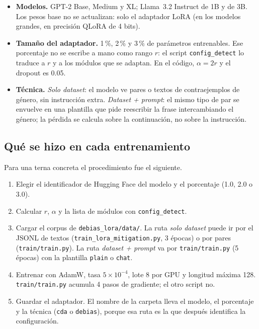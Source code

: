 \documentclass[11pt,a4paper]{article}
\newcommand{\archivo}[1]{\texttt{\nolinkurl{#1}}}
\begin{document}
\begin{itemize}[leftmargin=*, itemsep=0.35em]
  \item \textbf{Modelos.} GPT-2 Base, Medium y XL; Llama~3.2 Instruct de 1B y de 3B. Los pesos base no se
        actualizan: solo el adaptador LoRA (en los modelos grandes, en precisión QLoRA de 4 bits).
  \item \textbf{Tamaño del adaptador.} 1\,\%, 2\,\% y 3\,\% de parámetros entrenables. Ese porcentaje no se
        escribe a mano como rango $r$: el script \texttt{config\_detect} lo traduce a $r$ y a los módulos
        que se adaptan. En el código, $\alpha = 2r$ y el dropout es 0.05.
  \item \textbf{Técnica.} \emph{Solo dataset}: el modelo ve pares o textos de contraejemplos de género, sin
        instrucción extra. \emph{Dataset + prompt}: el mismo tipo de par se envuelve en una plantilla que
        pide reescribir la frase intercambiando el género; la pérdida se calcula sobre la continuación,
        no sobre la instrucción.
\end{itemize}

\subsection{Qué se hizo en cada entrenamiento}

Para una terna concreta el procedimiento fue el siguiente.

\begin{enumerate}[leftmargin=*, itemsep=0.4em]
  \item Elegir el identificador de Hugging Face del modelo y el porcentaje (1.0, 2.0 o 3.0).
  \item Calcular $r$, $\alpha$ y la lista de módulos con \texttt{config\_detect}.
  \item Cargar el corpus de \archivo{debias\_lora/data/}. La ruta \emph{solo dataset} puede ir por el
        JSONL de textos (\archivo{train\_lora\_mitigation.py}, 3 épocas) o por pares
        (\archivo{train/train.py}). La ruta \emph{dataset + prompt} va por \archivo{train/train.py}
        (5 épocas) con la plantilla \texttt{plain} o \texttt{chat}.
  \item Entrenar con AdamW, tasa $5\times 10^{-4}$, lote 8 por GPU y longitud máxima 128.
        \archivo{train/train.py} acumula 4 pasos de gradiente; el otro script no.
  \item Guardar el adaptador. El nombre de la carpeta lleva el modelo, el porcentaje y la técnica
        (\texttt{cda} o \texttt{debias}), porque esa ruta es la que después identifica la configuración.
\end{enumerate}
\end{document}
